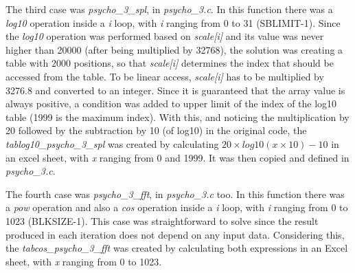 \begin{comment}
\begin{figure}[H]
\centerline{\fbox{\texttt{[image: init.pdf]}}}
\caption{\textit{psycho\_3\_init\_add\_db} function.}
\label{init}
\end{figure}
\end{comment}


The third case was \textit{psycho\_3\_spl}, in \textit{psycho\_3.c}. In this function there was a \textit{log10} operation inside a \textit{i} loop, with \textit{i} ranging from 0 to 31 (SBLIMIT-1). Since the \textit{log10} operation was performed based on \textit{scale[i]} and its value was never higher than 20000 (after being multiplied by 32768), the solution was creating a table with 2000 positions, so that \textit{scale[i]} determines the index that should be accessed from the table. 
To be linear access, \textit{scale[i]} has to be multiplied by 3276.8 and converted to an integer. Since it is guaranteed that the array value is always positive, a condition was added to upper limit of the index of the log10 table (1999 is the maximum index). With this, and noticing the multiplication by 20 followed by the subtraction by 10 (of log10) in the original code, the \textit{tablog10\_psycho\_3\_spl} was created by calculating $20\times log10(x\times 10)-10$ in an excel sheet, with \textit{x} ranging from 0 and 1999. It was then copied and defined in \textit{psycho\_3.c}.

\begin{comment}
\begin{figure}[H]
\centerline{\fbox{\texttt{[image: spl.pdf]}}}
\caption{\textit{psycho\_3\_spl} function.}
\label{spl}
\end{figure}

\vspace{1cm}
\end{comment}

The fourth case was \textit{psycho\_3\_fft}, in \textit{psycho\_3.c} too. In this function there was a \textit{pow} operation and also a \textit{cos} operation inside a \textit{i} loop, with \textit{i} ranging from 0 to 1023 (BLKSIZE-1). This case was straightforward to solve since the result produced in each iteration does not depend on any input data. Considering this, the \textit{tabcos\_psycho\_3\_fft} was created by calculating both expressions in an Excel sheet, with \textit{x} ranging from 0 to 1023.

